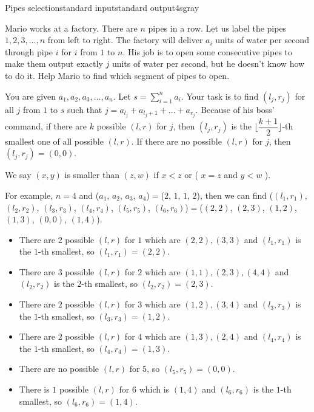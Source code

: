 \begin{problem}{Pipes selection}{standard input}{standard output}{4s}{gray}

Mario works at a factory. There are $n$ pipes in a row. Let us label the pipes $1, 2, 3,\ldots, n$ from left to right.
The factory will deliver $a_i$ units of water per second through pipe $i$ for $i$ from $1$ to $n$. 
His job is to open some consecutive pipes to make them output exactly $j$ units of water per second, but he doesn't know how to do it. 
Help Mario to find which segment of pipes to open.

You are given $a_1, a_2, a_3, \ldots,a_n$. Let $s=\sum\limits_{i=1}^{n}a_i$.
Your task is to find $(l_j, r_j)$ for all $j$ from $1$ to $s$ such that $j=a_{l_j}+a_{l_{j}+1}+\ldots +a_{r_j}$. 
Because of his boss' command, if there are $k$ possible $(l, r)$ for $j$, 
then $(l_j, r_j)$ is the $\lfloor \dfrac{k+1}{2} \rfloor$-th smallest one of all possible $(l, r)$. 
If there are no possible $(l,r)$ for $j$, then $(l_j, r_j)=(0, 0)$.

We say $(x, y)$ is smaller than $(z, w)$ if $x<z$ or ( $x=z$ and $y<w$ ).

For example, $n=4$ and ($a_1$, $a_2$, $a_3$, $a_4$)$=$($2$, $1$, $1$, $2$), then we can find 
($(l_1,r_1)$, $(l_2,r_2)$, $(l_3,r_3)$, $(l_4,r_4)$, $(l_5,r_5)$, $(l_6,r_6)$)$=$($(2,2)$, $(2,3)$, $(1,2)$, $(1,3)$, $(0,0)$, $(1,4)$). 
\begin{itemize}
\item There are $2$ possible $(l,r)$ for $1$ which are $(2,2),(3,3)$       and $(l_1,r_1)$ is the $1$-th smallest, so $(l_1,r_1)=(2,2)$.
\item There are $3$ possible $(l,r)$ for $2$ which are $(1,1),(2,3),(4,4)$ and $(l_2,r_2)$ is the $2$-th smallest, so $(l_2,r_2)=(2,3)$.
\item There are $2$ possible $(l,r)$ for $3$ which are $(1,2),(3,4)$       and $(l_3,r_3)$ is the $1$-th smallest, so $(l_3,r_3)=(1,2)$.
\item There are $2$ possible $(l,r)$ for $4$ which are $(1,3),(2,4)$       and $(l_4,r_4)$ is the $1$-th smallest, so $(l_4,r_4)=(1,3)$.
\item There are no  possible $(l,r)$ for $5$, so $(l_5,r_5)=(0,0)$.
\item There is  $1$ possible $(l,r)$ for $6$ which is  $(1,4)$             and $(l_6,r_6)$ is the $1$-th smallest, so $(l_6,r_6)=(1,4)$.
\end{itemize}

\InputFile


\end{problem}
